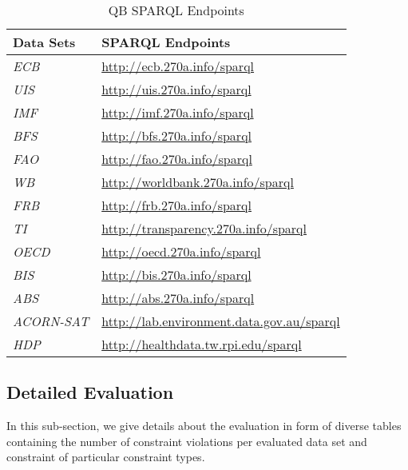 \documentclass{llncs}
\begin{document}
\begin{table}[H]
	\centering
		\begin{tabular}{l|l}
      \textbf{Data Sets} & \textbf{SPARQL Endpoints} \\		
      \hline
      \emph{ECB} & \url{http://ecb.270a.info/sparql} \\
			\emph{UIS} & \url{http://uis.270a.info/sparql} \\
			\emph{IMF} & \url{http://imf.270a.info/sparql} \\
			\emph{BFS} & \url{http://bfs.270a.info/sparql} \\
			\emph{FAO} & \url{http://fao.270a.info/sparql} \\
			\emph{WB} & \url{http://worldbank.270a.info/sparql} \\
			\emph{FRB} & \url{http://frb.270a.info/sparql} \\
			\emph{TI} & \url{http://transparency.270a.info/sparql} \\
			\emph{OECD} & \url{http://oecd.270a.info/sparql} \\
			\emph{BIS} & \url{http://bis.270a.info/sparql} \\
			\emph{ABS} & \url{http://abs.270a.info/sparql} \\
			\emph{ACORN-SAT} & \url{http://lab.environment.data.gov.au/sparql} \\
			\emph{HDP} & \url{http://healthdata.tw.rpi.edu/sparql} \\
		\end{tabular}
	\caption{QB SPARQL Endpoints}
	\label{tab:data-cube-sparql-endpoints}
\end{table}

\subsection{Detailed Evaluation}

In this sub-section, we give details about the evaluation in form of diverse tables containing the number of constraint violations per evaluated data set and constraint of particular constraint types.
\end{document}

